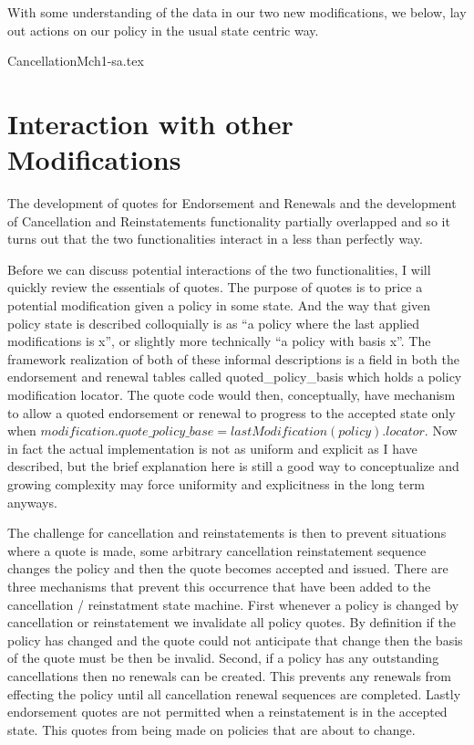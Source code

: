 With some understanding of the data in our two new modifications, we below, lay out actions on our policy in the usual
state centric way. 

{CancellationMch1-sa.tex}

\section{Interaction with other Modifications}
The development of quotes for Endorsement and Renewals and the development of Cancellation and Reinstatements functionality
partially overlapped and so it turns out that the two functionalities interact in a less than perfectly way.

Before we can discuss potential interactions of the two functionalities, I will quickly review the essentials of quotes. The
purpose of quotes is to price a potential modification given a policy in some state. And the way that given policy state is described
colloquially is as ``a policy where the last applied modifications is x'', or slightly more technically ``a policy with basis x''. The
framework realization of both of these informal descriptions is a field in both the endorsement and
renewal tables called quoted\_policy\_basis which holds a policy modification locator. The quote code would then, conceptually, have
mechanism to allow a quoted endorsement or renewal to progress to the accepted state only when
$ modification.quote\_policy\_base = lastModification(policy).locator $. Now in
fact the actual implementation is not as uniform and explicit as I have described, but the brief explanation here is still a good way
to conceptualize and growing complexity may force uniformity and explicitness in the long term anyways.

The challenge for cancellation and reinstatements is then to prevent situations where a quote is made, some arbitrary cancellation
reinstatement sequence changes the policy and then the quote becomes accepted and issued. There are three mechanisms that
prevent this occurrence that have been added to the cancellation / reinstatment state machine. First whenever a policy is
changed by cancellation or reinstatement we invalidate all policy quotes. By definition if the policy has changed and the quote
could not anticipate that change then the basis of the quote must be then be invalid. Second, if a policy has any outstanding
cancellations then no renewals can be created. This prevents any renewals from effecting the policy until all cancellation
renewal sequences are completed. Lastly endorsement quotes are not permitted when a reinstatement is in the accepted state. This
quotes from being made on policies that are about to change.

